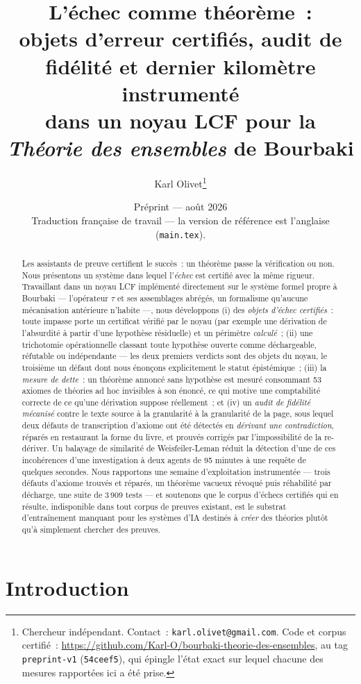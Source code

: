 \documentclass[11pt]{article}
\title{L'échec comme théorème~:\\
objets d'erreur certifiés, audit de fidélité et dernier kilomètre instrumenté\\
dans un noyau LCF pour la \emph{Théorie des ensembles} de Bourbaki}
\author{Karl Olivet\thanks{Chercheur indépendant. Contact~:
\texttt{karl.olivet@gmail.com}. Code et corpus certifié~: \url{https://github.com/Karl-O/bourbaki-theorie-des-ensembles}, au tag
\texttt{preprint-v1} (\texttt{54ceef5}), qui épingle l'état exact sur lequel chacune des
mesures rapportées ici a été prise.}}
\date{Préprint --- août 2026\\
{\small Traduction française de travail --- la version de référence est l'anglaise (\texttt{main.tex}).}}
\theoremstyle{remark}\newtheorem{example}{Exemple}
\begin{document}
\maketitle

\begin{abstract}
Les assistants de preuve certifient le succès~: un théorème passe la vérification ou
non. Nous présentons un système dans lequel l'\emph{échec} est certifié avec la même
rigueur. Travaillant dans un noyau LCF implémenté directement sur le système formel
propre à Bourbaki --- l'opérateur $\tau$ et ses assemblages abrégés, un formalisme
qu'aucune mécanisation antérieure n'habite ---, nous
développons (i) des \emph{objets d'échec
certifiés}~: toute impasse porte un certificat vérifié par le noyau (par exemple une
dérivation de l'absurdité à partir d'une hypothèse résiduelle) et un périmètre
\emph{calculé}~; (ii) une trichotomie opérationnelle classant toute hypothèse ouverte
comme déchargeable, réfutable ou indépendante --- les deux premiers verdicts sont des
objets du noyau, le troisième un défaut dont nous énonçons explicitement le statut
épistémique~; (iii) la \emph{mesure de dette}~: un théorème annoncé sans hypothèse est
mesuré consommant 53 axiomes de théories ad hoc invisibles à son énoncé, ce qui motive
une comptabilité correcte de ce qu'une dérivation suppose réellement~; et (iv) un
\emph{audit de fidélité mécanisé} contre le texte source à la granularité
à la granularité de la page, sous lequel deux défauts de transcription d'axiome ont été détectés en
\emph{dérivant une contradiction}, réparés en restaurant la forme du livre, et prouvés
corrigés par l'impossibilité de la re-dériver. Un balayage de similarité de
Weisfeiler-Leman réduit la détection d'une de ces incohérences d'une investigation à
deux agents de 95 minutes à une requête de quelques secondes.
Nous rapportons une semaine d'exploitation instrumentée --- trois défauts d'axiome
trouvés et réparés, un théorème vacueux révoqué puis réhabilité par décharge, une suite
de 3\,909 tests --- et soutenons que le corpus d'échecs certifiés qui en résulte,
indisponible dans tout corpus de preuves existant, est le substrat d'entraînement
manquant pour les systèmes d'IA destinés à \emph{créer} des théories plutôt qu'à
simplement chercher des preuves.
\end{abstract}

\section{Introduction}
\end{document}
